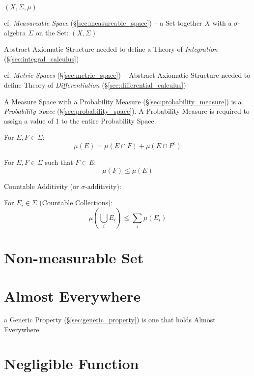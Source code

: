 $(X,\Sigma,\mu)$

\fist cf. \emph{Measureable Space} (\S\ref{sec:measureable_space}) -- a Set
together $X$ with a $\sigma$-algebra $\Sigma$ on the Set: $(X,\Sigma)$

Abstract Axiomatic Structure needed to define a Theory of \emph{Integration}
(\S\ref{sec:integral_calculus})

cf. \emph{Metric Spaces} (\S\ref{sec:metric_space}) -- Abstract Axiomatic
Structure needed to define Theory of \emph{Differentiation}
(\S\ref{sec:differential_calculus})

A Measure Space with a Probability Measure (\S\ref{sec:probability_measure}) is
a \emph{Probability Space} (\S\ref{sec:probability_space}). A Probability
Measure is required to assign a value of $1$ to the entire Probability Space.

For $E,F \in \Sigma$:
\[
  \mu(E) = \mu(E \cap F) + \mu(E \cap F^c)
\]

For $E,F \in \Sigma$ such that $F \subset E$:
\[
  \mu(F) \leq \mu(E)
\]

Countable Additivity (or $\sigma$-additivity): %

For $E_i \in \Sigma$ (Countable Collections):
\[
  \mu(\bigcup_i E_i) \leq \sum_i \mu(E_i)
\]



\section{Non-measurable Set}\label{sec:nonmeasurable_set}

\section{Almost Everywhere}\label{sec:almost_everywhere}

a Generic Property (\S\ref{sec:generic_property}) is one that holds Almost
Everywhere



\section{Negligible Function}\label{sec:negligible_function}

